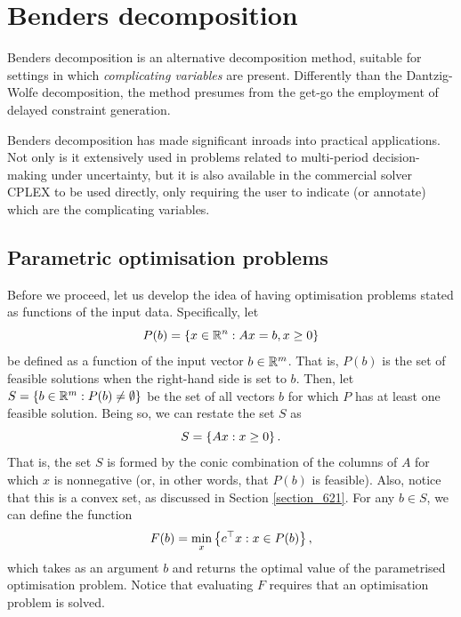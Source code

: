 \section{Benders decomposition}

Benders decomposition is an alternative decomposition method, suitable for settings in which \emph{complicating variables} are present. Differently than the Dantzig-Wolfe decomposition, the method presumes from the get-go the employment of delayed constraint generation. 

Benders decomposition has made significant inroads into practical applications. Not only is it extensively used in problems related to multi-period decision-making under uncertainty, but it is also available in the commercial solver CPLEX to be used directly, only requiring the user to indicate (or annotate) which are the complicating variables. 


\subsection{Parametric optimisation problems} \label{section_731}

Before we proceed, let us develop the idea of having optimisation problems stated as functions of the input data. Specifically, let 
%
\begin{equation*}
	P(b) = \left\{ x \in \mathbb{R}^n : Ax = b, x \geq 0 \right \}
\end{equation*}
%
be defined as a function of the input vector $b \in \mathbb{R}^m$. That is, $P(b)$ is the set of feasible solutions when the right-hand side is set to $b$. Then, let $S = \left\{ b \in \mathbb{R}^m : P(b) \neq \emptyset \right \}$ be the set of all vectors $b$ for which $P$ has at least one feasible solution. Being so, we can restate the set $S$ as 
%
\begin{equation*}
	S = \left\{ Ax : x \ge 0 \right \}.
\end{equation*}
%
That is, the set $S$ is formed by the conic combination of the columns of $A$ for which $x$ is nonnegative (or, in other words, that $P(b)$ is feasible). Also, notice that this is a convex set, as discussed in Section \ref{section_621}. For any $b \in S$, we can define the function
%
\begin{equation}
	F(b) = \min_x \left\{ c^\top x : x  \in P(b) \right \},	
\end{equation}
%
which takes as an argument $b$ and returns the optimal value of the parametrised optimisation problem. Notice that evaluating $F$ requires that an optimisation problem is solved.

